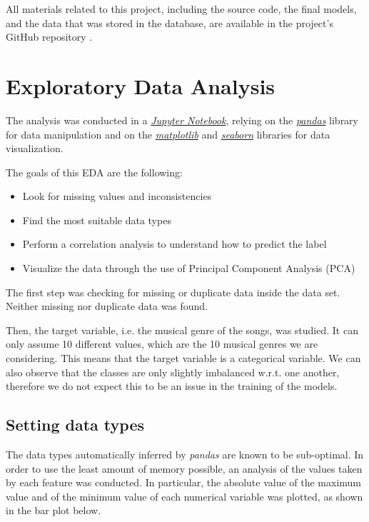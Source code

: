 \documentclass{Configuration_Files/PoliMi3i_thesis}
\begin{document}
All materials related to this project, including the source code, the final models, and the data that was stored in the database, are available in the project's GitHub repository \cite{project-repository}.


\chapter{Exploratory Data Analysis}
\label{ch:eda}%
The analysis was conducted in a \href{https://jupyter.org/}{\textit{Jupyter Notebook}}, relying on the \href{https://pypi.org/project/pandas/}{\textit{pandas}} library for data manipulation and on the \href{https://pypi.org/project/matplotlib/}{\textit{matplotlib}} and \href{https://pypi.org/project/seaborn/}{\textit{seaborn}} libraries for data visualization. 

The goals of this EDA are the following:
\begin{itemize}
    \item Look for missing values and inconsistencies
    \item Find the most suitable data types
    \item Perform a correlation analysis to understand how to predict the label
    \item Visualize the data through the use of Principal Component Analysis (PCA)
\end{itemize}

The first step was checking for missing or duplicate data inside the data set.  \\
Neither missing nor duplicate data was found.

Then, the target variable, i.e. the musical genre of the songs, was studied. It can only assume 10 different values, which are the 10 musical genres we are considering. This means that the target variable is a categorical variable. We can also observe that the classes are only slightly imbalanced w.r.t. one another, therefore we do not expect this to be an issue in the training of the models.

\section{Setting data types}
\label{sec:datatypes}%
The data types automatically inferred by \textit{pandas} are known to be sub-optimal. In order to use the least amount of memory possible, an analysis of the values taken by each feature was conducted.
In particular, the absolute value of the maximum value and of the minimum value of each numerical variable was plotted, as shown in the bar plot below.
\end{document}
